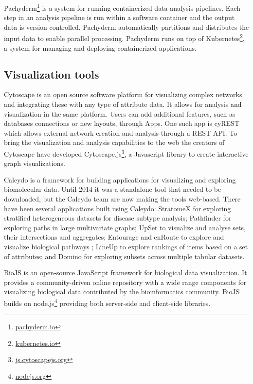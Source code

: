 Pachyderm\footnote{\url{pachyderm.io}} is a system for running containerized
data analysis pipelines. Each step in an analysis pipeline is run within a
software container and the output data is version controlled. Pachyderm
automatically partitions and distributes the input data to enable parallel
processing. Pachyderm runs on top of Kubernetes\footnote{\url{kubernetes.io}},
a system for managing and deploying containerized applications. 

\subsection*{Visualization tools} 
Cytoscape is an open source software platform for visualizing complex
networks and integrating these with any type of attribute
data\cite{shannon2003cytoscape}. It allows for analysis and visualization in the
same platform. Users can add additional features, such as databases connections
or new layouts, through Apps. One such app is cyREST which allows external
network creation and analysis through a REST API\cite{ono2015cyrest}.  To bring
the visualization and analysis capabilities to the web the creators of Cytoscape
have developed Cytoscape.js\footnote{\url{js.cytoscapejs.org}}, a Javascript
library to create interactive graph visualizations. 

Caleydo is a framework for building applications for visualizing and exploring
biomolecular data\cite{cleydo}. Until 2014 it was a standalone tool that needed
to be downloaded, but the Caleydo team are now making the tools web-based. There
have been several applications built using Caleydo: StratomeX for exploring
stratified heterogeneous datasets for disease subtype analysis\cite{stratomex};
Pathfinder for exploring paths in large multivariate graphs\cite{pathfinder};
UpSet to visualize and analyse sets, their intersections and
aggregates\cite{upset}; Entourage and enRoute to explore and visualize
biological pathways \cite{entourage}\cite{enroute}; LineUp to explore rankings
of items based on a set of attributes\cite{lineup}; and Domino for exploring
subsets across multiple tabular datasets\cite{domino}. 

BioJS is an open-source JavaScript framework for biological data
visualization.\cite{gomez2013biojs} It provides a community-driven online
repository with a wide range components for visualizing biological data
contributed by the bioinformatics community. BioJS builds on
node.js\footnote{\url{nodejs.org}} providing both server-side and client-side
libraries. 

